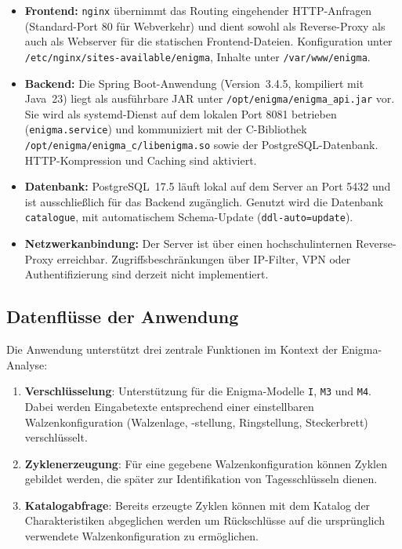 \documentclass[12pt, ngerman, a4paper, numbers=noenddot]{article}
\begin{document}
\begin{itemize}
	\item \textbf{Frontend:} \lstinline|nginx| übernimmt das Routing eingehender HTTP-Anfragen (Standard-Port 80 für Webverkehr) und dient sowohl als Reverse-Proxy als auch als Webserver für die statischen Frontend-Dateien. Konfiguration unter \lstinline|/etc/nginx/sites-available/enigma|, Inhalte unter \lstinline|/var/www/enigma|.	
	
	\item \textbf{Backend:} Die Spring Boot-Anwendung (Version~3.4.5, kompiliert mit Java~23) liegt als ausführbare JAR unter \lstinline|/opt/enigma/enigma_api.jar| vor. Sie wird als systemd-Dienst auf dem lokalen Port 8081 betrieben (\lstinline|enigma.service|) und kommuniziert mit der C-Bibliothek \lstinline|/opt/enigma/enigma_c/libenigma.so| sowie der PostgreSQL-Datenbank. HTTP-Kompression und Caching sind aktiviert.
	
	\item \textbf{Datenbank:} PostgreSQL~17.5 läuft lokal auf dem Server an Port 5432 und ist ausschließlich für das Backend zugänglich. Genutzt wird die Datenbank \lstinline|catalogue|, mit automatischem Schema-Update (\lstinline|ddl-auto=update|).
	
	\item \textbf{Netzwerkanbindung:} Der Server ist über einen hochschulinternen Reverse-Proxy erreichbar. Zugriffsbeschränkungen über IP-Filter, VPN oder Authentifizierung sind derzeit nicht implementiert.
\end{itemize}
\newpage
\subsection{Datenflüsse der Anwendung}

Die Anwendung unterstützt drei zentrale Funktionen im Kontext der Enigma-Analyse:

\begin{enumerate}
	\item \textbf{Verschlüsselung}: Unterstützung für die Enigma-Modelle \lstinline|I|, \lstinline|M3| und \lstinline|M4|. Dabei werden Eingabetexte entsprechend einer einstellbaren Walzenkonfiguration (Walzenlage, -stellung, Ringstellung, Steckerbrett) verschlüsselt.
	
	\item \textbf{Zyklenerzeugung}: Für eine gegebene Walzenkonfiguration können Zyklen gebildet werden, die später zur Identifikation von Tagesschlüsseln dienen.
	
	\item \textbf{Katalogabfrage}: Bereits erzeugte Zyklen können mit dem Katalog der Charakteristiken abgeglichen werden um Rückschlüsse auf die ursprünglich verwendete Walzenkonfiguration zu ermöglichen.
\end{enumerate}
\end{document}
